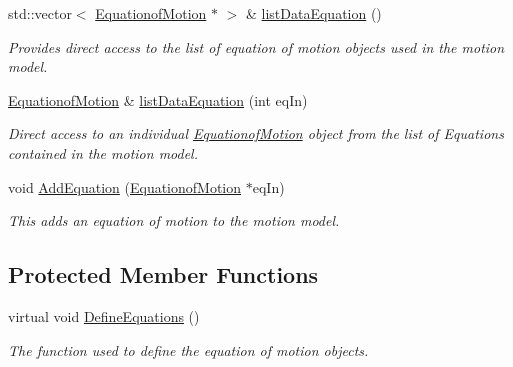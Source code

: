 \begin{DoxyCompactItemize}
std\-::vector$<$ \hyperlink{classosea_1_1ofreq_1_1_equationof_motion}{Equationof\-Motion} $\ast$ $>$ \& \hyperlink{classosea_1_1ofreq_1_1_motion_model_a644171d63e9dba6a0b1ec57be33653f7}{list\-Data\-Equation} ()
\begin{DoxyCompactList}\small\item\em Provides direct access to the list of equation of motion objects used in the motion model. \end{DoxyCompactList}\item 
\hyperlink{classosea_1_1ofreq_1_1_equationof_motion}{Equationof\-Motion} \& \hyperlink{classosea_1_1ofreq_1_1_motion_model_a485a85942201e939102865f8923d9a51}{list\-Data\-Equation} (int eq\-In)
\begin{DoxyCompactList}\small\item\em Direct access to an individual \hyperlink{classosea_1_1ofreq_1_1_equationof_motion}{Equationof\-Motion} object from the list of Equations contained in the motion model. \end{DoxyCompactList}\item 
void \hyperlink{classosea_1_1ofreq_1_1_motion_model_a73489d88c07b26109bbb9bdd0a576b30}{Add\-Equation} (\hyperlink{classosea_1_1ofreq_1_1_equationof_motion}{Equationof\-Motion} $\ast$eq\-In)
\begin{DoxyCompactList}\small\item\em This adds an equation of motion to the motion model. \end{DoxyCompactList}\end{DoxyCompactItemize}
\subsection*{Protected Member Functions}
\begin{DoxyCompactItemize}
\item 
virtual void \hyperlink{classosea_1_1ofreq_1_1_motion_model_a001b525e45be6f6c8f9088dacbb161c6}{Define\-Equations} ()
\begin{DoxyCompactList}\small\item\em The function used to define the equation of motion objects. \end{DoxyCompactList}\end{DoxyCompactItemize}



